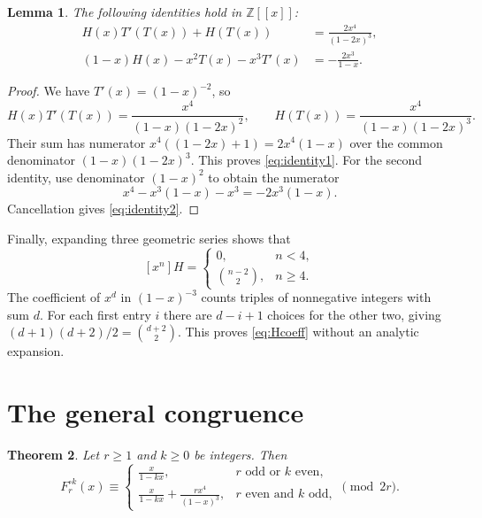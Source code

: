 \documentclass[11pt,a4paper]{article}
\newtheorem{theorem}{Theorem}[section]
\newtheorem{lemma}[theorem]{Lemma}
\theoremstyle{remark}\newtheorem{remark}[theorem]{Remark}
\newcommand{\Z}{\mathbb Z}
\newcommand{\coeff}[2]{[x^{#1}]#2}
\begin{document}
\begin{lemma}\label{lem:identities}
The following identities hold in $\Z[[x]]$:
\begin{align}
H(x)T'(T(x))+H(T(x))&=\frac{2x^4}{(1-2x)^3},
\label{eq:identity1}\\
(1-x)H(x)-x^2T(x)-x^3T'(x)&=-\frac{2x^3}{1-x}.
\label{eq:identity2}
\end{align}
\end{lemma}

\begin{proof}
We have $T'(x)=(1-x)^{-2}$, so
\[
H(x)T'(T(x))=\frac{x^4}{(1-x)(1-2x)^2},\qquad
H(T(x))=\frac{x^4}{(1-x)(1-2x)^3}.
\]
Their sum has numerator $x^4((1-2x)+1)=2x^4(1-x)$ over the
common denominator $(1-x)(1-2x)^3$. This proves
\eqref{eq:identity1}. For the second identity, use denominator
$(1-x)^2$ to obtain the numerator
\[
x^4-x^3(1-x)-x^3=-2x^3(1-x).
\]
Cancellation gives \eqref{eq:identity2}.
\end{proof}

Finally, expanding three geometric series shows that
\begin{equation}\label{eq:Hcoeff}
\coeff{n}{H}=
\begin{cases}
0,&n<4,\\
\binom{n-2}{2},&n\ge4.
\end{cases}
\end{equation}
The coefficient of $x^d$ in $(1-x)^{-3}$ counts triples of
nonnegative integers with sum $d$. For each first entry $i$ there
are $d-i+1$ choices for the other two, giving
$(d+1)(d+2)/2=\binom{d+2}{2}$. This proves
\eqref{eq:Hcoeff} without an analytic expansion.

\section{The general congruence}

\begin{theorem}\label{thm:general}
Let $r\ge1$ and $k\ge0$ be integers. Then
\begin{equation}\label{eq:general-congruence}
F_r^{\circ k}(x)\equiv
\begin{cases}
\displaystyle\frac{x}{1-kx},&r\text{ odd or }k\text{ even},\\[7pt]
\displaystyle\frac{x}{1-kx}+\frac{rx^4}{(1-x)^3},
&r\text{ even and }k\text{ odd},
\end{cases}
\pmod{2r}.
\end{equation}
\end{theorem}
\end{document}
